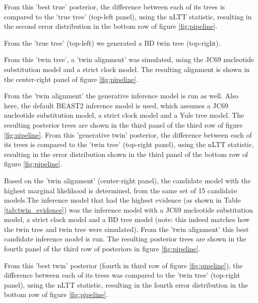From this 'best true' posterior, the difference between each of its trees is
compared to the 'true tree' (top-left panel), using the nLTT statistic,
resulting in the second error distribution in the bottom row
of figure \ref{fig:pipeline}.

From the 'true tree' (top-left) we generated a BD twin tree (top-right).

From this 'twin tree', a 'twin alignment' was simulated, using
the JC69 nucleotide substitution model and a strict clock model.
The resulting alignment is shown in the center-right panel
of figure \ref{fig:pipeline}.

From the 'twin alignment' the generative inference model is run as well.
Also here, the default BEAST2 inference model is used, 
which assumes a JC69 nucleotide
substitution model, a strict clock model and a Yule tree model.
The resulting posterior trees are shown in the
third panel of the third row of figure \ref{fig:pipeline}.
From this 'generative twin' posterior, 
the difference between each of its trees is
compared to the 'twin tree' (top-right panel), using the nLTT statistic,
resulting in the error distribution shown in the third panel
of the bottom row of figure \ref{fig:pipeline}.

Based on the 'twin alignment' (center-right panel), the candidate model
with the highest marginal likelihood is determined, from the same 
set of 15 candidate models.The inference model that had the
highest evidence (as shown in Table \ref{tab:twin_evidence}) was 
the inference model with a JC69 nucleotide substitution model,
a strict clock model and a BD tree model (note: this indeed matches how
the twin tree and twin tree were simulated).
From the 'twin alignment' this best candidate inference model is run.
The resulting posterior trees are shown in the fourth panel
of the third row of posteriors in figure \ref{fig:pipeline}.

From this 'best twin' posterior (fourth in third row of
figure \ref{fig:pipeline}), the difference between each of its trees was
compared to the 'twin tree' (top-right panel), using the nLTT statistic,
resulting in the fourth error distribution in the bottom row
of figure \ref{fig:pipeline}.

